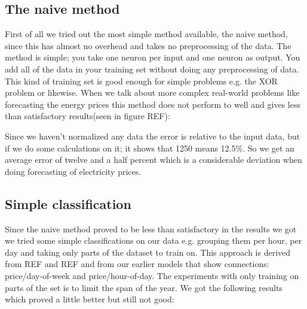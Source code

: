 \subsection{The naive method}
First of all we tried out the most simple method available, the naive method, since this has almost no overhead and takes no preprocessing of the data. The method is simple; you take one neuron per input and one neuron as output. You add all of the data in your training set without doing any preprocessing of data. This kind of training set is good enough for simple problems e.g. the XOR problem or likewise. When we talk about more complex real-world problems like forecasting the energy prices this method does not perform to well and gives less than satisfactory results(seen in figure REF):

\begin{table}[!ht]\footnotesize
\centering  %
\caption{Results from the naive training approach.} %
\label{table:naiveTrainingApproach} %
\end{table}

Since we haven't normalized any data the error is relative to the input data, but if we do some calculations on it; it shows that 1250 means 12.5\%. So we get an average error of twelve and a half percent which is a considerable deviation when doing forecasting of electricity prices. 

\subsection{Simple classification}
Since the naive method proved to be less than satisfactory in the results we got we tried some simple classifications on our data e.g. grouping them per hour, per day and taking only parts of the dataset to train on. This approach is derived from REF and REF and from our earlier models that show connections: price/day-of-week and price/hour-of-day. The experiments with only training on parts of the set is to limit the span of the year. We got the following results which proved a little better but still not good:

